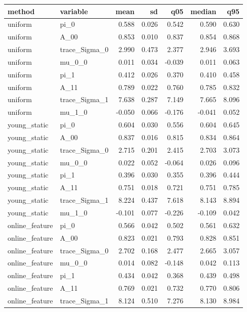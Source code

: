 \begin{tabular}{llrrrrr}
\toprule
method & variable & mean & sd & q05 & median & q95 \\
\midrule
uniform & pi\_0 & 0.588 & 0.026 & 0.542 & 0.590 & 0.630 \\
uniform & A\_00 & 0.853 & 0.010 & 0.837 & 0.854 & 0.868 \\
uniform & trace\_Sigma\_0 & 2.990 & 0.473 & 2.377 & 2.946 & 3.693 \\
uniform & mu\_0\_0 & 0.011 & 0.034 & -0.039 & 0.011 & 0.063 \\
uniform & pi\_1 & 0.412 & 0.026 & 0.370 & 0.410 & 0.458 \\
uniform & A\_11 & 0.789 & 0.022 & 0.760 & 0.785 & 0.832 \\
uniform & trace\_Sigma\_1 & 7.638 & 0.287 & 7.149 & 7.665 & 8.096 \\
uniform & mu\_1\_0 & -0.050 & 0.066 & -0.176 & -0.041 & 0.052 \\
young\_static & pi\_0 & 0.604 & 0.030 & 0.556 & 0.604 & 0.645 \\
young\_static & A\_00 & 0.837 & 0.016 & 0.815 & 0.834 & 0.864 \\
young\_static & trace\_Sigma\_0 & 2.715 & 0.201 & 2.415 & 2.703 & 3.073 \\
young\_static & mu\_0\_0 & 0.022 & 0.052 & -0.064 & 0.026 & 0.096 \\
young\_static & pi\_1 & 0.396 & 0.030 & 0.355 & 0.396 & 0.444 \\
young\_static & A\_11 & 0.751 & 0.018 & 0.721 & 0.751 & 0.785 \\
young\_static & trace\_Sigma\_1 & 8.224 & 0.437 & 7.618 & 8.143 & 8.894 \\
young\_static & mu\_1\_0 & -0.101 & 0.077 & -0.226 & -0.109 & 0.042 \\
online\_feature & pi\_0 & 0.566 & 0.042 & 0.502 & 0.561 & 0.632 \\
online\_feature & A\_00 & 0.823 & 0.021 & 0.793 & 0.828 & 0.851 \\
online\_feature & trace\_Sigma\_0 & 2.702 & 0.168 & 2.477 & 2.665 & 3.057 \\
online\_feature & mu\_0\_0 & 0.014 & 0.082 & -0.148 & 0.042 & 0.113 \\
online\_feature & pi\_1 & 0.434 & 0.042 & 0.368 & 0.439 & 0.498 \\
online\_feature & A\_11 & 0.769 & 0.021 & 0.732 & 0.770 & 0.806 \\
online\_feature & trace\_Sigma\_1 & 8.124 & 0.510 & 7.276 & 8.130 & 8.984 \\

\end{tabular}
